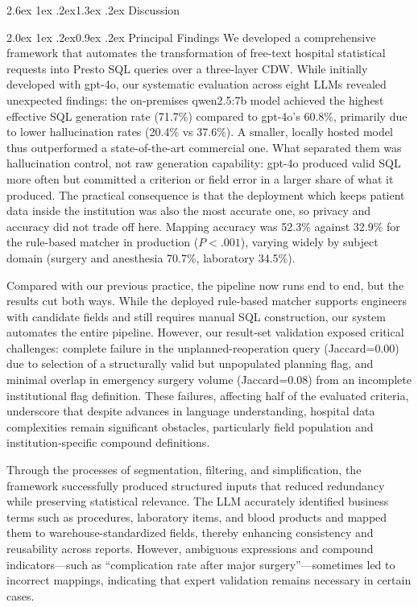 \documentclass[10pt]{article}
\makeatletter
\renewcommand\section{\@startsection{section}{1}{\z@}%
  {2.6ex \@plus 1ex \@minus .2ex}{1.3ex \@plus .2ex}%
  {\normalfont\large\bfseries}}
\renewcommand\subsection{\@startsection{subsection}{2}{\z@}%
  {2.0ex \@plus 1ex \@minus .2ex}{0.9ex \@plus .2ex}%
  {\normalfont\normalsize\bfseries}}
\makeatother
\begin{document}
\section{Discussion}

\subsection{Principal Findings}
We developed a comprehensive framework that automates the transformation of
free-text hospital statistical requests into Presto SQL queries over a
three-layer CDW. While initially developed with gpt-4o, our systematic
evaluation across eight LLMs revealed unexpected findings: the on-premises
qwen2.5:7b model achieved the highest effective SQL generation rate (71.7\%)
compared to gpt-4o's 60.8\%, primarily due to lower hallucination rates (20.4\%
vs 37.6\%). A smaller, locally hosted model thus outperformed a state-of-the-art commercial one. What separated them was hallucination control, not raw generation capability: gpt-4o produced valid SQL more often but committed a criterion or field error in a larger share of what it produced. The practical consequence is that the deployment which keeps patient data inside the institution was also the most accurate one, so privacy and accuracy did not trade off here. Mapping accuracy was 52.3\% against 32.9\% for the rule-based matcher in production ($P<.001$), varying widely by subject domain (surgery and anesthesia 70.7\%, laboratory 34.5\%).

Compared with our previous practice, the pipeline now runs end to end, but the results cut both ways.
While the deployed rule-based matcher supports engineers with candidate fields
and still requires manual SQL construction, our system automates the entire
pipeline. However, our result-set validation exposed critical challenges:
complete failure in the unplanned-reoperation query (Jaccard=0.00) due to
selection of a structurally valid but unpopulated planning flag, and minimal
overlap in emergency surgery volume (Jaccard=0.08) from an incomplete
institutional flag definition. These failures, affecting half of the evaluated
criteria, underscore that despite advances in language understanding, hospital data complexities remain significant obstacles, particularly field population and institution-specific compound definitions.

Through the processes of segmentation, filtering, and simplification, the
framework successfully produced structured inputs that reduced redundancy while
preserving statistical relevance. The LLM accurately identified business terms
such as procedures, laboratory items, and blood products and mapped them to
warehouse-standardized fields, thereby enhancing consistency and reusability
across reports. However, ambiguous expressions and compound
indicators---such as ``complication rate after major surgery''---sometimes led
to incorrect mappings, indicating that expert validation remains necessary in
certain cases.
\end{document}
